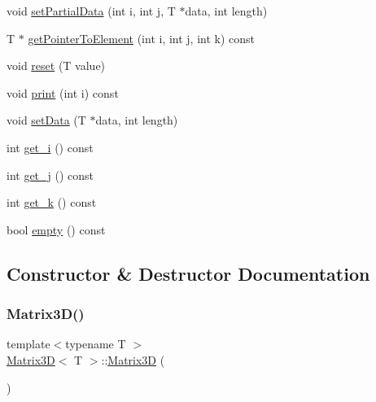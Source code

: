 \begin{DoxyCompactItemize}
\item 
void \mbox{\hyperlink{classMatrix3D_a46a7b732a44b77f6c09f72c0ae05edef}{set\+Partial\+Data}} (int i, int j, T $\ast$data, int length)
\item 
T $\ast$ \mbox{\hyperlink{classMatrix3D_ac21cf8967053b928f609b98abf1616e2}{get\+Pointer\+To\+Element}} (int i, int j, int k) const
\item 
void \mbox{\hyperlink{classMatrix3D_ac67d3ee632ccafaac86dfacdda95dfdf}{reset}} (T value)
\item 
void \mbox{\hyperlink{classMatrix3D_abc1d3451a2fb3cce0bec1d1e33097b1e}{print}} (int i) const
\item 
void \mbox{\hyperlink{classMatrix3D_a056c035f4997b14c2a3e2b8ebee5142c}{set\+Data}} (T $\ast$data, int length)
\item 
int \mbox{\hyperlink{classMatrix3D_af02576e685de872ba1b75014d9a609c9}{get\+\_\+i}} () const
\item 
int \mbox{\hyperlink{classMatrix3D_a083e3f136a0108aad991e194b078db7f}{get\+\_\+j}} () const
\item 
int \mbox{\hyperlink{classMatrix3D_a35fad9c3c81914e0ef5ed40ceda5d324}{get\+\_\+k}} () const
\item 
bool \mbox{\hyperlink{classMatrix3D_a6f1e6328bac16786a4bfad6f107db641}{empty}} () const
\end{DoxyCompactItemize}


\subsection{Constructor \& Destructor Documentation}
\mbox{\label{classMatrix3D_a1589c062f12fbbb1f3681f90c20c4b78}} 
\subsubsection{\texorpdfstring{Matrix3\+D()}{Matrix3D()}\hspace{0.1cm}{\footnotesize\ttfamily [1/3]}}
{\footnotesize\ttfamily template$<$typename T $>$ \\
\mbox{\hyperlink{classMatrix3D}{Matrix3D}}$<$ T $>$\+::\mbox{\hyperlink{classMatrix3D}{Matrix3D}} (\begin{DoxyParamCaption}{ }\end{DoxyParamCaption})}

\mbox{\label{classMatrix3D_a6c98f06b6f87c600bd9b00f6b253b37e}} 
